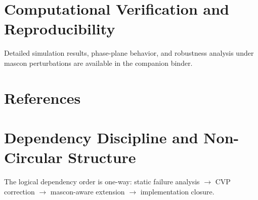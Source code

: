 \documentclass[11pt,a4paper]{article}
\begin{document}
\appendix
\section{Computational Verification and Reproducibility}
Detailed simulation results, phase-plane behavior, and robustness analysis under mascon perturbations are available in the companion binder.

\section{References}

\section{Dependency Discipline and Non-Circular Structure}
The logical dependency order is one-way: static failure analysis \(\to\) CVP correction \(\to\) mascon-aware extension \(\to\) implementation closure.
\end{document}
